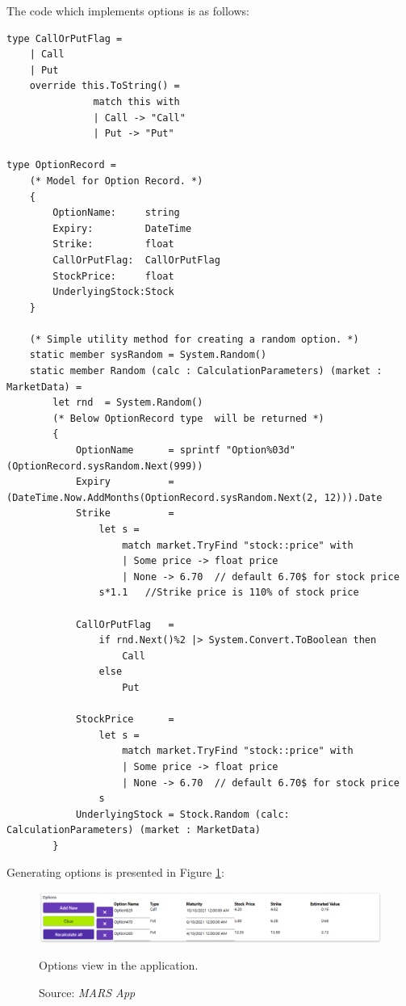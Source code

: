     The code which implements options is as follows:
    \begin{lstlisting}[label={lst:option}, caption=F\# implementation of an option.]
type CallOrPutFlag =
    | Call
    | Put
    override this.ToString() =
               match this with
               | Call -> "Call"
               | Put -> "Put"
               
type OptionRecord =
    (* Model for Option Record. *)
    {
        OptionName:     string
        Expiry:         DateTime
        Strike:         float
        CallOrPutFlag:  CallOrPutFlag
        StockPrice:     float
        UnderlyingStock:Stock
    }

    (* Simple utility method for creating a random option. *)
    static member sysRandom = System.Random()
    static member Random (calc : CalculationParameters) (market : MarketData) =
        let rnd  = System.Random()
        (* Below OptionRecord type  will be returned *)
        {
            OptionName      = sprintf "Option%03d" (OptionRecord.sysRandom.Next(999))
            Expiry          = (DateTime.Now.AddMonths(OptionRecord.sysRandom.Next(2, 12))).Date
            Strike          =
                let s =
                    match market.TryFind "stock::price" with
                    | Some price -> float price
                    | None -> 6.70  // default 6.70$ for stock price
                s*1.1   //Strike price is 110% of stock price
            
            CallOrPutFlag   = 
                if rnd.Next()%2 |> System.Convert.ToBoolean then
                    Call
                else
                    Put
            
            StockPrice      =
                let s =
                    match market.TryFind "stock::price" with
                    | Some price -> float price
                    | None -> 6.70  // default 6.70$ for stock price
                s
            UnderlyingStock = Stock.Random (calc: CalculationParameters) (market : MarketData)
        }
    \end{lstlisting}
    
    \noindent
    Generating options is presented in Figure \ref{fig:optionsPresentation}:
    \begin{figure}[H]
            \centering
            \includegraphics[width=\textwidth]{img/optionsPresentation.png}
            \caption{Options view in the application.}
            \caption*{Source: \textit{MARS App}}
            \label{fig:optionsPresentation}
    \end{figure}
    
